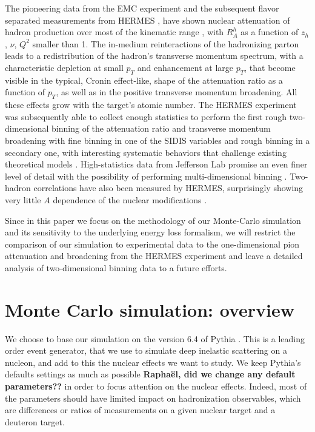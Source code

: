 The pioneering data from the EMC experiment \cite{Arvidson:1984fz,Ashman:1991cx} and the subsequent flavor separated measurements from HERMES \cite{Airapetian:2003mi,Airapetian:2007vu}, have shown nuclear attenuation of hadron production over most of the kinematic range \cite{Ashman:1991cx,Airapetian:2003mi,Airapetian:2007vu}, with $R_A^h$ as a function of $z_h$, $\nu$, $Q^2$ smaller than 1. The in-medium reinteractions of the hadronizing parton leads to a redistribution of the hadron's transverse momentum spectrum, with a characteristic depletion at small $p_T$ and enhancement at large $p_T$, that become visible in the typical, Cronin effect-like, shape of the attenuation ratio as a function of $p_T$, as well as in the positive transverse momentum broadening. All these effects grow with the target's atomic number.
The HERMES experiment was subsequently able to collect enough statistics to perform the first rough two-dimensional binning of the attenuation ratio and transverse momentum broadening with fine binning in one of the SIDIS variables and rough binning in a secondary one, with interesting systematic behaviors that challenge existing theoretical models \cite{Airapetian:2011jp}. High-statistics data from Jefferson Lab promise an even finer level of detail with the possibility of performing multi-dimensional binning \cite{Daniel:2011nq,Brooks:2009xg,DupreQNP}. Two-hadron correlations have also been measured by HERMES, surprisingly showing very little $A$ dependence of the nuclear modifications \cite{Airapetian:2005yh}.

%
Since in this paper we focus on the methodology of our Monte-Carlo simulation and its sensitivity to the underlying energy loss formalism, we will restrict the comparison of our simulation to experimental data to the one-dimensional pion attenuation and broadening from the HERMES experiment and leave a detailed analysis of two-dimensional binning data to a future efforts.


\section{Monte Carlo simulation: overview}

We choose to base our simulation on the version 6.4 of Pythia \cite{Sjostrand:2006za}. This is a leading order event generator, that we use to simulate deep inelastic scattering on a nucleon, and add to this the nuclear effects we want to study. We keep Pythia's defaults settings as much as possible {\bf Rapha\"el, did we change any default parameters??} in order to focus attention on the nuclear effects. Indeed, most of the parameters should have limited impact on hadronization observables, which are differences or ratios of measurements on a given nuclear target and a deuteron target. 

